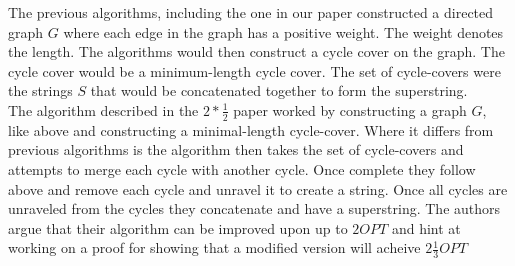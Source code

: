 \documentclass[letterpaper,11pt,titlepage]{article}
\begin{document}
The previous algorithms, including the one in our paper constructed a directed graph $G$ where each edge in the graph has a positive weight. The weight denotes the length. The algorithms would then construct a cycle cover on the graph. The cycle cover would be a minimum-length cycle cover. The set of cycle-covers were the strings $S$ that would be concatenated together to form the superstring.\\

The algorithm described in the $2*\frac{1}{2}$ paper worked by constructing a graph $G$, like above and constructing a minimal-length cycle-cover. Where it differs from previous algorithms is the algorithm then takes the set of cycle-covers and attempts to merge each cycle with another cycle. Once complete they follow above and remove each cycle and unravel it to create a string. Once all cycles are unraveled from the cycles they concatenate and have a superstring. The authors argue that their algorithm can be improved upon up to $2OPT$ and hint at working on a proof for showing that a modified version will acheive $2\frac{1}{3} OPT$\\

\newpage

{
  \small 
  
  
}
\end{document}
